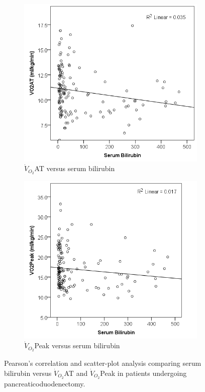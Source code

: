 \begin{figure}[htbp]
	\centering
	\begin{subfigure}{0.48\textwidth}
		\centering
		\includegraphics[width=\textwidth]{Figures/cpet_oj_scatter_at_bil}
		\caption{$\dot{V}_{O_2}$AT versus serum bilirubin}
		\label{fig:cpet_oj_scatter_at_bil}
	\end{subfigure}
	\begin{subfigure}{0.48\textwidth}
		\centering
		\includegraphics[width=\textwidth]{Figures/cpet_oj_scatter_peak_bil}
		\caption{$\dot{V}_{O_2}$Peak versus serum bilirubin}
		\label{fig:cpet_oj_scatter_peak_bil}
	\end{subfigure}
	
	\caption{Pearson's correlation and scatter-plot analysis comparing serum bilirubin versus $\dot{V}_{O_2}$AT and $\dot{V}_{O_2}$Peak in patients undergoing pancreaticoduodenectomy.}
	\label{fig:cpet_oj_scatter}
	
\end{figure}

